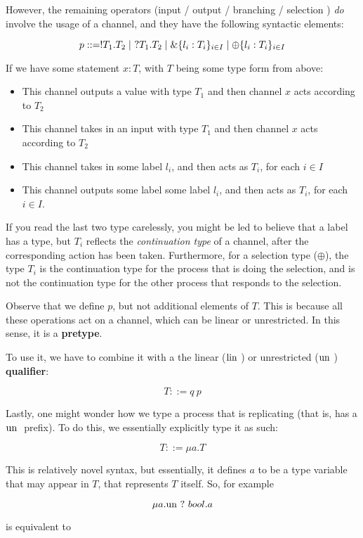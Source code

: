 However, the remaining operators (input / output / branching / selection ) \textit{do} involve the usage of a channel, and they have the following syntactic elements:

$$
p ::= !T_1.T_2 \mid \ ?T_1.T_2 \mid \&\{l_i : T_i\}_{i \in I} \mid \oplus \{l_i : T_i\}_{i \in I}
$$

If we have some statement $x : T$, with $T$ being some type form from above:
\begin{itemize}
    \item This channel outputs a value with type $T_1$ and then channel $x$ acts according to $T_2$
    \item This channel takes in an input with type $T_1$ and then channel $x$ acts according to $T_2$
    \item This channel takes in some label $l_i$, and then acts as $T_i$, for each $i \in I$
    \item This channel outputs some label some label $l_i$, and then acts as $T_i$, for each $i \in I$.
\end{itemize}

If you read the last two type carelessly, you might be led to believe that a label has a type, but $T_i$ reflects the \textit{continuation type} of a channel, after the corresponding action has been taken. Furthermore, for a selection type ($\oplus$), the type $T_i$ is the continuation type for the process that is doing the selection, and is not the continuation type for the other process that responds to the selection.

Observe that we define $p$, but not additional elements of $T$. This is because all these operations act on a channel, which can be linear  or unrestricted. In this sense, it is a \textbf{pretype}.

To use it, we have to combine it with a the linear ($\text{lin }$) or unrestricted ($\text{un }$) \textbf{qualifier}:

$$
T ::= q\ p
$$

Lastly, one might wonder how we type a process that is replicating (that is, has a $\text{un }$ prefix). To do this, we essentially explicitly type it as such:

$$
T ::= \mu a.T
$$

This is relatively novel syntax, but essentially, it defines $a$ to be a type variable that may appear in $T$, that represents $T$ itself. So, for example

$$
\mu a. \text{un } ?\ bool . a
$$

is equivalent to

